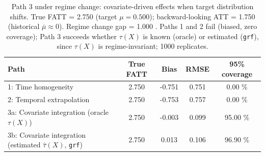 \begin{table}[htbp]
\centering
\caption{Path 3 under regime change: covariate-driven effects when target distribution shifts. True FATT = 
2.750
 (target $\mu=
0.500
$); backward-looking ATT = 
1.750
 (historical $\bar{\mu} \approx 0$). Regime change gap = 
1.000
. Paths 1 and 2 fail (biased, zero coverage); Path 3 succeeds whether $\tau(X)$ is known (oracle) or estimated (\texttt{grf}), since $\tau(X)$ is regime-invariant; 
1000
 replicates.}
\label{tab:path3}
\begin{tabular}{lcccc}
\toprule
Path & True FATT & Bias & RMSE & 95\% coverage \\
\midrule
1: Time homogeneity & 
2.750
 & 
-0.751
 & 
0.751
 & 
0.00
\% \\
2: Temporal extrapolation & 
2.750
 & 
-0.753
 & 
0.757
 & 
0.00
\% \\
3a: Covariate integration (oracle $\tau(X)$) & 
2.750
 & 
-0.003
 & 
0.099
 & 
95.00
\% \\
3b: Covariate integration (estimated $\widehat{\tau}(X)$, \texttt{grf}) & 
2.750
 & 
0.013
 & 
0.106
 & 
96.90
\% \\
\bottomrule
\end{tabular}
\end{table}
